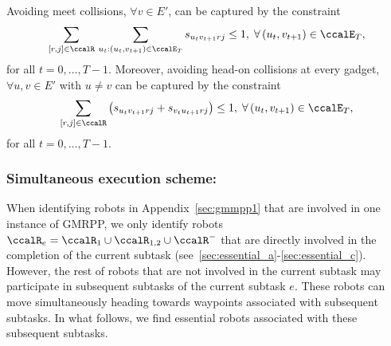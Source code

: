 \documentclass[Afour,sageh,times]{sagej}
\begin{document}
{{Avoiding meet collisions,  $\forall v \in E'$, can be captured by the constraint
\begin{align}\label{eq:meet}
 \sum_{[r,j]\in\ccalR}  \, \sum_{u_t: (u_t, v_{t+1}) \in \ccalE_T} s_{u_t v_{t+1} r j } \leq 1,  \; \forall \,(u_t, v_{t+1}) \in \ccalE_T,
\end{align}
for all $t=0,\ldots,T-1$. Moreover, avoiding head-on collisions at every  gadget, $\forall u, v \in E'$ with $u\not= v$ can be captured by the constraint
\begin{align}\label{eq:headon}
 \sum_{[r,j]\in \ccalR} \left( s_{u_t v_{t+1} r j } + s_{v_t u_{t+1} r j } \right) \leq 1, \; \forall \,(u_t, v_{t+1}) \in \ccalE_T,
\end{align}
for all $t=0,\ldots,T-1$.


\subsubsection{Simultaneous execution scheme:}\label{sec:extension_essential}
When identifying robots in Appendix~\ref{sec:gmmpp1} that are involved in one instance of GMRPP, we only identify robots $\ccalR_e =\ccalR_1 \cup \ccalR_{1,2} \cup \ccalR^-$ that are directly involved in the completion of the current subtask (see~\ref{sec:essential_a}-\ref{sec:essential_c}). However, the rest of robots that are not involved in the current subtask may participate in subsequent subtasks of  the current subtask $e$. These robots can move simultaneously  heading towards  waypoints associated with subsequent subtasks. In what follows, we find essential robots associated with these subsequent subtasks.

}}
\end{document}
